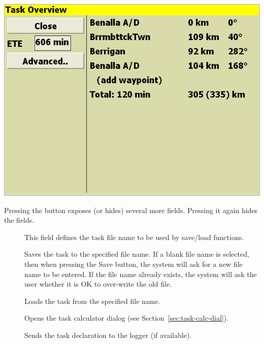 \documentclass[a4paper,12pt]{refrep}
\begin{document}
\begin{center}
\includegraphics[angle=0,width=\linewidth,keepaspectratio='true']{figures/dialog-taskedit1.png}
\end{center}

Pressing the  button exposes (or hides) several more
fields.  Pressing it again hides the fields.
\begin{description}
\item[] This field defines the task file name to be used by save/load functions.  
\item[] Saves the task to the specified file name.  If a blank file name is selected, then when pressing the Save button, the system will ask for a new file name to be entered.  If the file name already exists, the system will ask the user whether it is OK to over-write the old file.
\item[] Loads the task from the specified file name.
\item[] Opens the task calculator dialog (see Section~\ref{sec:task-calc-dial}).
\item[] Sends the task declaration to the logger (if available).
\end{description} 
\end{document}
